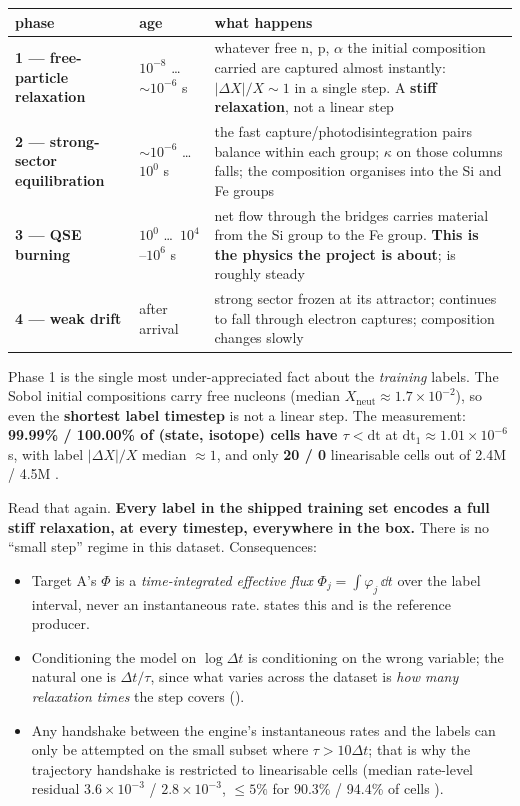 \begingroup\small
\begin{tabularx}{\textwidth}{@{}L{3.6cm} L{2.6cm} Y@{}}
\toprule
\textbf{phase} & \textbf{age} & \textbf{what happens} \\
\midrule
\textbf{1 --- free-particle relaxation} & $10^{-8}$ \ldots\ ${\sim}10^{-6}$ s &
  whatever free n, p, $\alpha$ the initial composition carried are captured
  almost instantly: $\lvert \Delta X\rvert / X \sim 1$ in a single step. A
  \textbf{stiff relaxation}, not a linear step \\
\textbf{2 --- strong-sector equilibration} & ${\sim}10^{-6}$ \ldots\ $10^{0}$ s &
  the fast capture/photodisintegration pairs balance within each group;
  $\kappa$ on those columns falls; the composition organises into the Si and
  Fe groups \\
\textbf{3 --- QSE burning} & $10^{0}$ \ldots\ $10^{4}$--$10^{6}$ s &
  net flow through the bridges carries material from the Si group to the Fe
  group. \textbf{This is the physics the project is about}; \enuc{} is roughly
  steady \\
\textbf{4 --- weak drift} & after arrival &
  strong sector frozen at its attractor; \Ye{} continues to fall through
  electron captures; composition changes slowly \\
\bottomrule
\end{tabularx}
\endgroup

Phase 1 is the single most under-appreciated fact about the \emph{training}
labels. The Sobol initial compositions carry free nucleons (median
$X_{\mathrm{neut}} \approx 1.7 \times 10^{-2}$), so even the \textbf{shortest
label timestep} is not a linear step. The measurement: \textbf{99.99\% /
100.00\% of (state, isotope) cells have $\tau < \mathrm{dt}$} at
$\mathrm{dt}_1 \approx 1.01 \times 10^{-6}$ s, with label $|\Delta X|/X$ median
$\approx 1$, and only \textbf{20 / 0} linearisable cells out of 2.4M / 4.5M
.

Read that again. \textbf{Every label in the shipped training set encodes a full
stiff relaxation, at every timestep, everywhere in the box.} There is no
``small step'' regime in this dataset. Consequences:

\begin{itemize}
\item Target A's $\Phi$ is a \emph{time-integrated effective flux}
  $\Phi_j = \int \varphi_j\,\dd t$ over the label interval, never an
  instantaneous rate.  states this and
   is the reference producer.
\item Conditioning the model on $\log \Delta t$ is conditioning on the wrong
  variable; the natural one is $\Delta t/\tau$, since what varies across the
  dataset is \emph{how many relaxation times} the step covers
  ().
\item Any handshake between the engine's instantaneous rates and the labels can
  only be attempted on the small subset where $\tau > 10\Delta t$; that is why
  the trajectory handshake is restricted to linearisable cells (median
  rate-level residual $3.6 \times 10^{-3}$ / $2.8 \times 10^{-3}$, $\le 5\%$
  for 90.3\% / 94.4\% of cells ).
\end{itemize}

